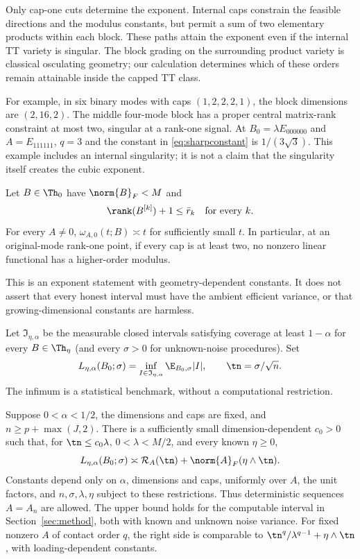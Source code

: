 Only cap-one cuts determine the exponent. Internal caps constrain the feasible directions and the modulus constants, but permit a sum of two elementary products within each block. These paths attain the exponent even if the internal TT variety is singular. The block grading on the surrounding product variety is classical osculating geometry; our calculation determines which of these orders remain attainable inside the capped TT class.

For example, in six binary modes with caps $(1,2,2,2,1)$, the block dimensions are $(2,16,2)$. The middle four-mode block has a proper central matrix-rank constraint at most two, singular at a rank-one signal. At $B_0=\lambda E_{000000}$ and $A=E_{111111}$, $q=3$ and the constant in \eqref{eq:sharpconstant} is $1/(3\sqrt3)$. This example includes an internal singularity; it is not a claim that the singularity itself creates the cubic exponent.

\begin{proposition}\label{prop:slack}
Let $B\in\Th_0$ have $\norm{B}_F<M$ and
\[
 \rank(B^{[k]})+1\le\bar r_k\quad\text{for every }k.
\]
For every $A\ne0$, $\omega_{A,0}(t;B)\asymp t$ for sufficiently small $t$. In particular, at an original-mode rank-one point, if every cap is at least two, no nonzero linear functional has a higher-order modulus.
\end{proposition}

This is an exponent statement with geometry-dependent constants. It does not assert that every honest interval must have the ambient efficient variance, or that growing-dimensional constants are harmless.

Let $\mathfrak I_{\eta,\alpha}$ be the measurable closed intervals satisfying coverage at least $1-\alpha$ for every $B\in\Th_\eta$ (and every $\sigma>0$ for unknown-noise procedures). Set
\[
 L_{\eta,\alpha}(B_0;\sigma)=\inf_{I\in\mathfrak I_{\eta,\alpha}}\E_{B_0,\sigma}|I|,
 \qquad \tn=\sigma/\sqrt n.
\]
The infimum is a statistical benchmark, without a computational restriction.

\begin{theorem}\label{thm:length}
Suppose $0<\alpha<1/2$, the dimensions and caps are fixed, and $n\ge p+\max(J,2)$. There is a sufficiently small dimension-dependent $c_0>0$ such that, for $\tn\le c_0\lambda$, $0<\lambda<M/2$, and every known $\eta\ge0$,
\begin{equation}\label{eq:length}
 L_{\eta,\alpha}(B_0;\sigma)\asymp
 \mathcal R_A(\tn)+\norm{A}_F(\eta\wedge\tn).
\end{equation}
Constants depend only on $\alpha$, dimensions and caps, uniformly over $A$, the unit factors, and $n,\sigma,\lambda,\eta$ subject to these restrictions. Thus deterministic sequences $A=A_n$ are allowed. The upper bound holds for the computable interval in Section~\ref{sec:method}, both with known and unknown noise variance. For fixed nonzero $A$ of contact order $q$, the right side is comparable to $\tn^q/\lambda^{q-1}+\eta\wedge\tn$, with loading-dependent constants.
\end{theorem}

